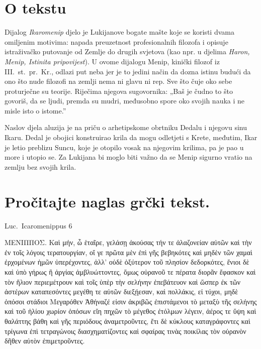 


\section*{O tekstu}

Dijalog \textit{Ikaromenip} djelo je Lukijanove bogate mašte koje se koristi dvama omiljenim motivima: napada preuzetnost profesionalnih filozofa i opisuje istraživačko putovanje od Zemlje do drugih svjetova (kao npr. u djelima \textit{Haron, Menip, Istinita pripovijest}). U ovome dijalogu Menip, kinički filozof iz III.~st.\ pr.~Kr., odlazi put neba jer je to jedini način da dozna istinu budući da ono što nude filozofi na zemlji nema ni glavu ni rep. Sve što čuje oko sebe proturječne su teorije. Riječima njegova sugovornika: „Baš je čudno to što govoriš, da se ljudi, premda su mudri, međusobno spore oko svojih nauka i ne misle isto o istome.” 

Naslov djela aluzija je na priču o arhetipskome obrtniku Dedalu i njegovu sinu Ikaru. Dedal je obojici konstruirao krila da mogu odletjeti s Krete, međutim, Ikar je letio preblizu Suncu, koje je otopilo vosak na njegovim krilima, pa je pao u more i utopio se. Za Lukijana bi moglo biti važno da se Menip sigurno vratio na zemlju bez svojih krila.


\newpage

\section*{Pročitajte naglas grčki tekst.}

Luc.\ Icaromenippus 6


\medskip


{\large

\begin{greek}

\noindent ΜΕΝΙΠΠΟΣ. Καὶ μήν, ὦ ἑταῖρε, γελάσῃ ἀκούσας τήν τε ἀλαζονείαν αὐτῶν καὶ τὴν ἐν τοῖς λόγοις τερατουργίαν, οἵ γε πρῶτα μὲν ἐπὶ γῆς βεβηκότες καὶ μηδὲν τῶν χαμαὶ ἐρχομένων ἡμῶν ὑπερέχοντες, ἀλλ' οὐδὲ ὀξύτερον τοῦ πλησίον δεδορκότες, ἔνιοι δὲ καὶ ὑπὸ γήρως ἢ ἀργίας ἀμβλυώττοντες, ὅμως οὐρανοῦ τε πέρατα διορᾶν ἔφασκον καὶ τὸν ἥλιον περιεμέτρουν καὶ τοῖς ὑπὲρ τὴν σελήνην ἐπεβάτευον καὶ ὥσπερ ἐκ τῶν ἀστέρων καταπεσόντες μεγέθη τε αὐτῶν διεξῄεσαν, καὶ πολλάκις, εἰ τύχοι, μηδὲ ὁπόσοι στάδιοι Μεγαρόθεν Ἀθήναζέ εἰσιν ἀκριβῶς ἐπιστάμενοι τὸ μεταξὺ τῆς σελήνης καὶ τοῦ ἡλίου χωρίον ὁπόσων εἴη πηχῶν τὸ μέγεθος ἐτόλμων λέγειν, ἀέρος τε ὕψη καὶ θαλάττης βάθη καὶ γῆς περιόδους ἀναμετροῦντες, ἔτι δὲ κύκλους καταγράφοντες καὶ τρίγωνα ἐπὶ τετραγώνοις διασχηματίζοντες καὶ σφαίρας τινὰς ποικίλας τὸν οὐρανὸν δῆθεν αὐτὸν ἐπιμετροῦντες.

\end{greek}

}


